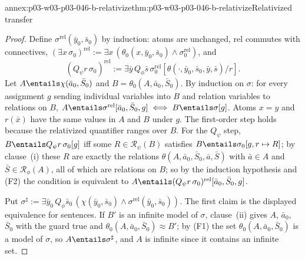 \begin{annexitem}{annex:p03-w03-p03-046-b-relativize}{thm:p03-w03-p03-046-b-relativize}{Relativized transfer}
\begin{proof}
Define \(\sigma^{\mathrm{rel}}(\bar y_0,\bar s_0)\) by induction: atoms
are unchanged, \(\mathrm{rel}\) commutes with connectives,
\((\exists x\,\sigma_0)^{\mathrm{rel}}:=\exists
x\,(\theta_0(x,\bar y_0,\bar s_0)\wedge\sigma_0^{\mathrm{rel}})\), and
\[
(Q_\psi r\,\sigma_0)^{\mathrm{rel}}:=\exists\bar y\,Q_\phi\bar
s\,\sigma_0^{\mathrm{rel}}[\theta(\cdot,\bar y_0,\bar s_0,\bar y,\bar s)/r].
\]
Let \(A\entails\chi(\bar a_0,\bar S_0)\) and
\(B=\theta_0(A,\bar a_0,\bar S_0)\). By induction on \(\sigma\): for every
assignment \(g\) sending individual variables into \(B\) and relation
variables to relations on \(B\),
\(A\entails\sigma^{\mathrm{rel}}[\bar a_0,\bar S_0,g]\iff
B\entails\sigma[g]\). Atoms \(x=y\) and \(r(\bar x)\) have the same values
in \(A\) and \(B\) under \(g\). The first-order step holds because the
relativized quantifier ranges over \(B\). For the \(Q_\psi\) step,
\(B\entails Q_\psi r\,\sigma_0[g]\) iff some \(R\in\mathscr R_\psi(B)\)
satisfies \(B\entails\sigma_0[g,r\mapsto R]\); by clause~(i) these \(R\)
are exactly the relations \(\theta(A,\bar a_0,\bar S_0,\bar a,\bar S)\)
with \(\bar a\in A\) and \(\bar S\in\mathscr R_\phi(A)\), all of which are
relations on \(B\); so by the induction hypothesis and (F2) the condition
is equivalent to \(A\entails(Q_\psi r\,\sigma_0)^{\mathrm{rel}}[\bar
a_0,\bar S_0,g]\).

Put \(\sigma^\sharp:=\exists\bar y_0\,Q_\phi\bar
s_0\,(\chi(\bar y_0,\bar s_0)\wedge\sigma^{\mathrm{rel}}(\bar y_0,\bar
s_0))\). The first claim is the displayed equivalence for sentences. If
\(B'\) is an infinite model of \(\sigma\), clause~(ii) gives \(A\),
\(\bar a_0\), \(\bar S_0\) with the guard true and
\(\theta_0(A,\bar a_0,\bar S_0)\approx B'\); by (F1) the set
\(\theta_0(A,\bar a_0,\bar S_0)\) is a model of \(\sigma\), so
\(A\entails\sigma^\sharp\), and \(A\) is infinite since it contains an
infinite set.
\end{proof}
\end{annexitem}

